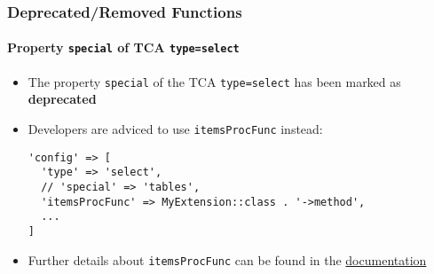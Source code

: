 %

\begin{frame}[fragile]
	\frametitle{Deprecated/Removed Functions}
	\framesubtitle{Property \texttt{special} of TCA \texttt{type=select}}


	\begin{itemize}
		\item The property \texttt{special} of the TCA \texttt{type=select}
			has been marked as \textbf{deprecated}
		\item Developers are adviced to use \texttt{itemsProcFunc} instead:
\begin{lstlisting}
'config' => [
  'type' => 'select',
  // 'special' => 'tables',
  'itemsProcFunc' => MyExtension::class . '->method',
  ...
]
\end{lstlisting}

		\item Further details about \texttt{itemsProcFunc} can be found in the
		 	\href{https://docs.typo3.org/m/typo3/reference-tca/master/en-us/ColumnsConfig/CommonProperties/ItemsProcFunc.html}{documentation}
	\end{itemize}

\end{frame}

